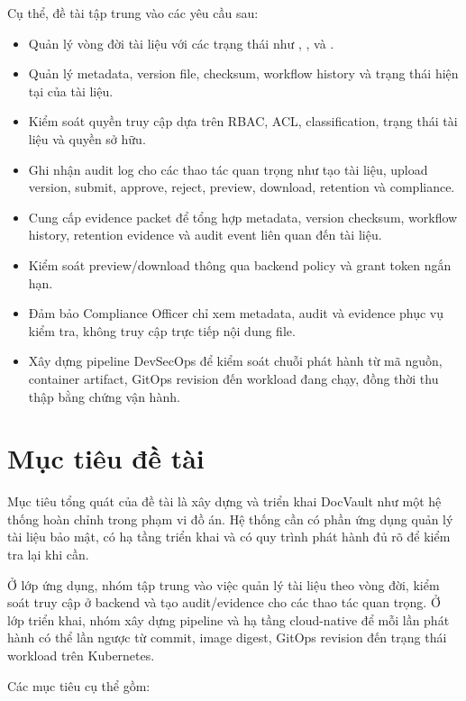Cụ thể, đề tài tập trung vào các yêu cầu sau:

\begin{itemize}
  \item Quản lý vòng đời tài liệu với các trạng thái như , ,  và .
  \item Quản lý metadata, version file, checksum, workflow history và trạng thái hiện tại của tài liệu.
  \item Kiểm soát quyền truy cập dựa trên RBAC, ACL, classification, trạng thái tài liệu và quyền sở hữu.
  \item Ghi nhận audit log cho các thao tác quan trọng như tạo tài liệu, upload version, submit, approve, reject, preview, download, retention và compliance.
  \item Cung cấp evidence packet để tổng hợp metadata, version checksum, workflow history, retention evidence và audit event liên quan đến tài liệu.
  \item Kiểm soát preview/download thông qua backend policy và grant token ngắn hạn.
  \item Đảm bảo Compliance Officer chỉ xem metadata, audit và evidence phục vụ kiểm tra, không truy cập trực tiếp nội dung file.
  \item Xây dựng pipeline DevSecOps để kiểm soát chuỗi phát hành từ mã nguồn, container artifact, GitOps revision đến workload đang chạy, đồng thời thu thập bằng chứng vận hành.
\end{itemize}

\section{Mục tiêu đề tài}

Mục tiêu tổng quát của đề tài là xây dựng và triển khai DocVault như một hệ thống hoàn chỉnh trong phạm vi đồ án. Hệ thống cần có phần ứng dụng quản lý tài liệu bảo mật, có hạ tầng triển khai và có quy trình phát hành đủ rõ để kiểm tra lại khi cần.

Ở lớp ứng dụng, nhóm tập trung vào việc quản lý tài liệu theo vòng đời, kiểm soát truy cập ở backend và tạo audit/evidence cho các thao tác quan trọng. Ở lớp triển khai, nhóm xây dựng pipeline và hạ tầng cloud-native để mỗi lần phát hành có thể lần ngược từ commit, image digest, GitOps revision đến trạng thái workload trên Kubernetes.

Các mục tiêu cụ thể gồm:

